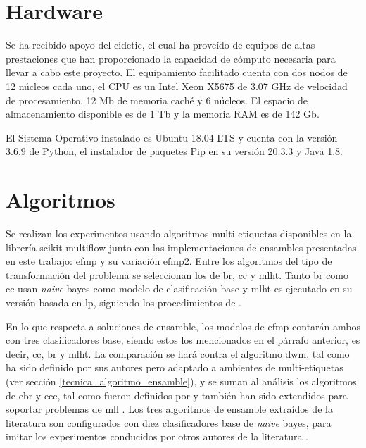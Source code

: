 \section{Hardware}

Se ha recibido apoyo del \acrfull{cidetic}, el cual ha proveído de equipos de
altas prestaciones que han proporcionado la capacidad de cómputo necesaria para
llevar a cabo este proyecto. El equipamiento facilitado cuenta con dos nodos de
12 núcleos cada uno, el CPU es un Intel Xeon X5675 de 3.07 GHz de velocidad de
procesamiento, 12 Mb de memoria caché y 6 núcleos. El espacio de almacenamiento
disponible es de 1 Tb y la memoria RAM es de 142 Gb. 

El Sistema Operativo instalado es Ubuntu 18.04 LTS y cuenta con la versión 3.6.9
de Python, el instalador de paquetes Pip en su versión 20.3.3 y Java 1.8.

\section{Algoritmos}
\label{experimentos_algoritmos}

Se realizan los experimentos usando algoritmos multi-etiquetas disponibles en la
librería scikit-multiflow junto con las implementaciones de ensambles
presentadas en este trabajo: \acrfull{efmp} y su variación \acrshort{efmp2}.
Entre los algoritmos del tipo de transformación del problema se seleccionan los
de \acrfull{br}, \acrfull{cc} y \acrfull{mlht}. Tanto \acrshort{br} como
\acrshort{cc} usan \textit{naive} bayes como modelo de clasificación base y
\acrshort{mlht} es ejecutado en su versión basada en \acrfull{lp}, siguiendo los
procedimientos de \citeauthor{read_scalable_2012} \cite{read_scalable_2012}.

En lo que respecta a soluciones de ensamble, los modelos de \acrshort{efmp}
contarán ambos con tres clasificadores base, siendo estos los mencionados en el
párrafo anterior, es decir, \acrshort{cc}, \acrshort{br} y \acrshort{mlht}. La
comparación se hará contra el algoritmo \acrfull{dwm}, tal como ha sido definido
por sus autores \cite{kolter_dynamic_2007} pero adaptado a ambientes de
multi-etiquetas (ver sección \ref{tecnica_algoritmo_ensamble}), y se suman al
análisis los algoritmos de \acrfull{ebr} y \acrfull{ecc}, tal como fueron
definidos por \citeauthor{oza_online_2005} \cite{oza_online_2005} y también han
sido extendidos para soportar problemas de \acrshort{mll}
\cite{read_classifier_2011}. Los tres algoritmos de ensamble extraídos de la
literatura son configurados con diez clasificadores base de \textit{naive}
bayes, para imitar los experimentos conducidos por otros autores de la
literatura \cite{osojnik_multi-label_2017, read_scalable_2012,
	buyukcakir_novel_2018}.

